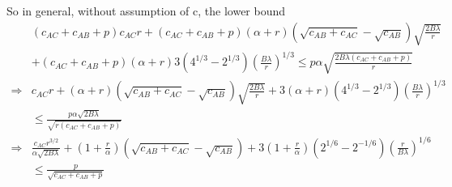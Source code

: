 \documentclass[12pt]{article}
\theoremstyle{plain}
\theoremstyle{remark}
\theoremstyle{definition}
\renewcommand{\leq}{\leqslant}
\renewcommand{\leq}{\leqslant}
\begin{document}
So in general, without assumption of c, the lower bound
\begin{align}
  &(c_{AC}+c_{AB}+p)c_{AC}r+ (c_{AC}+c_{AB}+p)(\alpha + r)(\sqrt{c_{AB}+ c_{AC}}-\sqrt{c_{AB}})\sqrt{\frac{2B\lambda }{r}}\\
  & + (c_{AC}+c_{AB}+p)(\alpha + r)3(4^{1/3}-2^{1/3})(\frac{B\lambda}{r})^{1/3} \leq p\alpha\sqrt{\frac{2B\lambda (c_{AC}+c_{AB}+p)}{r}} \\
  \Rightarrow &c_{AC}r+ (\alpha + r)(\sqrt{c_{AB}+ c_{AC}}-\sqrt{c_{AB}})\sqrt{\frac{2B\lambda }{r}}+ 3(\alpha + r)(4^{1/3}-2^{1/3})(\frac{B\lambda}{r})^{1/3} \\
  & \leq \frac{p\alpha\sqrt{2B\lambda} }{\sqrt{r(c_{AC}+c_{AB}+p)}}\\
  \Rightarrow &\frac{c_{AC}r^{3/2}}{\alpha\sqrt{2B\lambda} } + (1+\frac{r}{\alpha})(\sqrt{c_{AB}+ c_{AC}}-\sqrt{c_{AB}})+ 3(1+\frac{r}{\alpha})(2^{1/6}-2^{-1/6})(\frac{r}{B\lambda})^{1/6} \\
  & \leq \frac{p}{\sqrt{c_{AC}+c_{AB}+p}}
\end{align}
\end{document}
